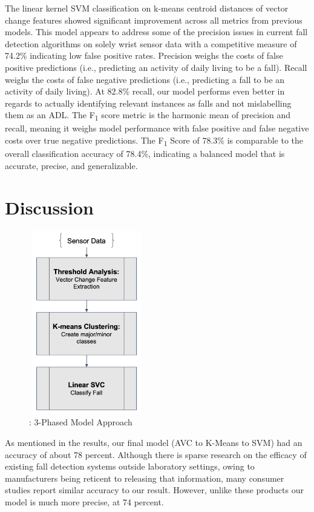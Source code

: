 \documentclass{llncs}
\begin{document}
	The linear kernel SVM classification on k-means centroid distances of vector change features showed significant improvement across all metrics from previous models. This model appears to address some of the precision issues in current fall detection algorithms on solely wrist sensor data with a competitive measure of 74.2\% indicating low false positive rates. Precision weighs the costs of false positive predictions (i.e., predicting an activity of daily living to be a fall). Recall weighs the costs of false negative predictions (i.e., predicting a fall to be an activity of daily living). At 82.8\% recall, our model performs even better in regards to actually identifying relevant instances as falls and not mislabelling them as an ADL. The F\textsubscript{1} score metric is the harmonic mean of precision and recall, meaning it weighs model performance with false positive and false negative costs over true negative predictions. The F\textsubscript{1} Score of 78.3\% is comparable to the overall classification accuracy of 78.4\%, indicating a balanced model that is accurate, precise, and generalizable. 

\section{Discussion}


\begin{figure}
	\centering
	\includegraphics[width=5cm, height=8cm]{images/ClassificationPipeline.png} 
	\caption{: 3-Phased Model Approach}
	\label{Figure 5: Classification Pipeline}
\end{figure}

As mentioned in the results, our final model (AVC to K-Means to SVM) had an accuracy of about 78 percent. Although there is sparse research on the efficacy of existing fall detection systems outside laboratory settings, owing to manufacturers being reticent to releasing that information, many consumer studies report similar accuracy to our result. However, unlike these products our model is much more precise, at 74 percent. 
	
\end{document}
